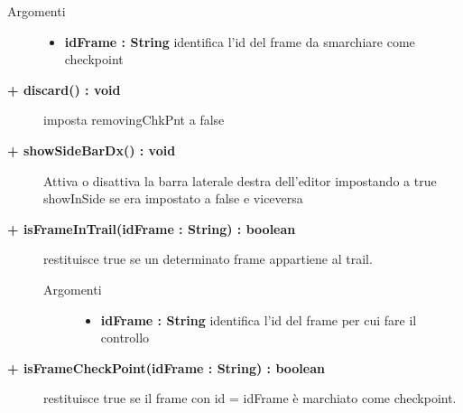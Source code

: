 \begin{description}
\begin{description}
		\begin{description}
			\item[Argomenti] \hfill
				\begin{itemize}
				
					\item \textbf{idFrame : String			} \hfill
						identifica l'id del frame da smarchiare come checkpoint
					
				\end{itemize}
		\end{description}
	\end{description}
	
	\begin{description}
		\item[\textbf{\color{blue}+ discard() : void			}] \hfill
			imposta removingChkPnt a false
	\end{description}
	
	\begin{description}
		\item[\textbf{\color{blue}+ showSideBarDx() : void			}] \hfill
			Attiva o disattiva la barra laterale destra dell’editor impostando a true
showInSide se era impostato a false e viceversa
			
	\end{description}
	
	\begin{description}
		\item[\textbf{\color{blue}+ isFrameInTrail(idFrame : String) : boolean			}] \hfill
			restituisce true se un determinato frame appartiene al trail.
			
		\begin{description}
			\item[Argomenti] \hfill
				\begin{itemize}
				
					\item \textbf{idFrame : String			} \hfill
						identifica l'id del frame per cui fare il controllo
					
				\end{itemize}
		\end{description}
	\end{description}
	
	\begin{description}
		\item[\textbf{\color{blue}+ isFrameCheckPoint(idFrame : String) : boolean			}] \hfill
			restituisce true se il frame con id = idFrame è marchiato come checkpoint.
			

\end{description}
\end{description}
